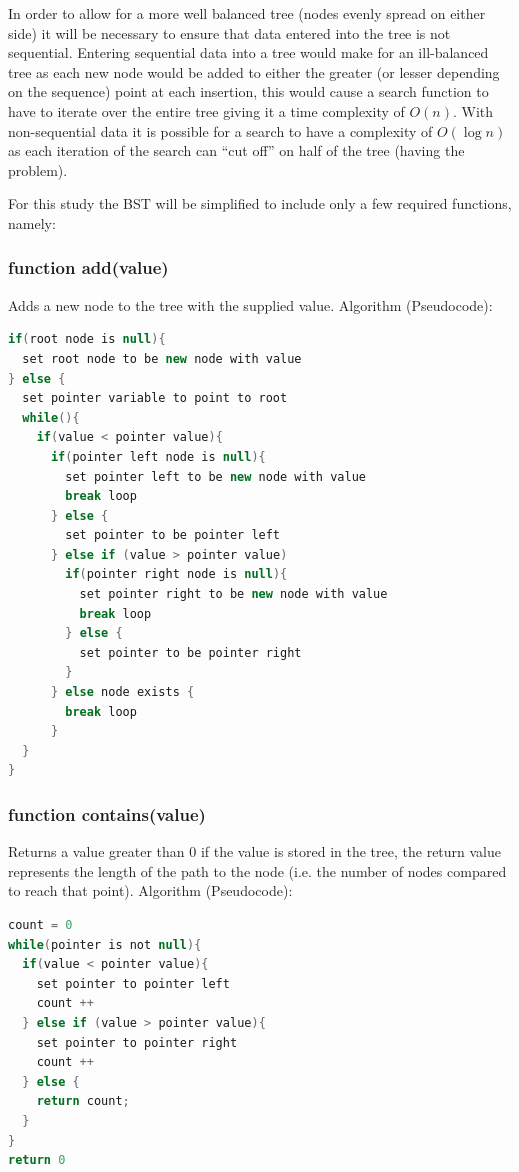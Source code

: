 \documentclass[pdftex,a4paper,10pt,titlepage]{article}
\begin{document}
In order to allow for a more well balanced tree (nodes evenly spread on either side) it will be necessary to ensure that data entered into the tree is not sequential. Entering sequential data into a tree would make for an ill-balanced tree as each new node would be added to either the greater (or lesser depending on the sequence) point at each insertion, this would cause a search function to have to iterate over the entire tree giving it a time complexity of $O(n)$. With non-sequential data it is possible for a search to have a complexity of $O(\log{}n)$ as each iteration of the search can “cut off” on half of the tree (having the problem).

For this study the BST will be simplified to include only a few required functions, namely:
\subsubsection{function add(value)}
Adds a new node to the tree with the supplied value.
Algorithm (Pseudocode):
\begin{lstlisting}[language=java]
if(root node is null){
  set root node to be new node with value
} else {
  set pointer variable to point to root
  while(){
    if(value < pointer value){
      if(pointer left node is null){
        set pointer left to be new node with value
        break loop
      } else {
        set pointer to be pointer left
      } else if (value > pointer value)
        if(pointer right node is null){
          set pointer right to be new node with value
          break loop
        } else {
          set pointer to be pointer right
        }
      } else node exists {
        break loop 
      }
  }
}
\end{lstlisting}

\pagebreak

\subsubsection{function contains(value)}
Returns a value greater than 0 if the value is stored in the tree, the return value represents the length of the path to the node (i.e. the number of nodes compared to reach that point).
Algorithm (Pseudocode):
\begin{lstlisting}[language=java]
count = 0
while(pointer is not null){
  if(value < pointer value){
    set pointer to pointer left
    count ++
  } else if (value > pointer value){
    set pointer to pointer right
    count ++
  } else {
    return count; 
  } 
}
return 0
\end{lstlisting}
\end{document}
